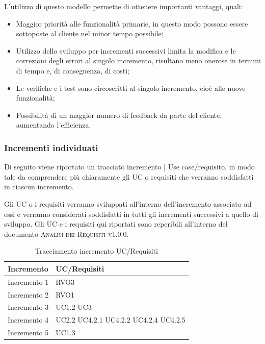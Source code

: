 \documentclass[../piano_di_progetto.tex]{subfiles}
\begin{document}
L'utilizzo di questo modello permette di ottenere importanti vantaggi, quali:
\begin{itemize}
    \item Maggior priorità alle funzionalità primarie, in questo modo possono essere sottoposte al cliente nel minor tempo possibile;
    \item Utilizzo dello sviluppo per incrementi successivi limita la modifica e le correzioni degli errori al singolo incremento, risultano meno onerose in termini di tempo e, di conseguenza, di costi;
    \item Le verifiche e i test sono circoscritti al singolo incremento, cioè alle nuove funzionalità;
    \item Possibilità di un maggior numero di feedback da parte del cliente, aumentando l'efficienza.
\end{itemize}


\subsubsection{Incrementi individuati}
\label{ssub:incr_ind}

Di seguito viene riportato un tracciato incremento | Use case/requisito, in modo tale da comprendere più chiaramente gli UC o requisiti che verranno soddisfatti in ciascun incremento. 

Gli UC o i requisiti verranno sviluppati all'interno dell'incremento associato ad essi e verranno considerati soddisfatti in tutti gli incrementi successivi a quello di sviluppo. Gli UC e i requisiti qui riportati sono reperibili all'interno del documento \textsc{Analisi dei Requisiti v1.0.0}.
\begin{table}[!ht]
	\centering
	\begin{tabular}{|p{3cm}|p{3cm}|}
	\hline
	\rowcolor{lightgray}
	\textbf{Incremento} & \textbf{UC/Requisiti}\\
	\hline
        Incremento 1 & RVO3\\
        Incremento 2 & RVO1\\
        Incremento 3 & UC1.2  UC3 \\
        Incremento 4 & UC2.2 UC4.2.1 UC4.2.2 UC4.2.4 UC4.2.5\\
        Incremento 5 & UC1.3\\
	\hline	
	\end{tabular}
	\caption{Tracciamento incremento UC/Requisiti}
\end{table}
\end{document}
